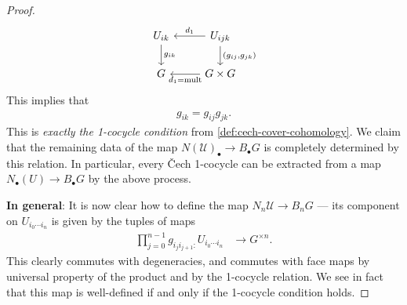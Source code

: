 \documentclass[11pt]{amsart}
\begin{document}
\begin{proof}
\[ \begin{tikzcd}
    U_{ik}\dar["g_{ik}"] & U_{ijk}\lar["d_1" above]\dar["{(g_{ij},g_{jk})}" right]\\
    G & G \times G\lar["d_1 = \text{mult}" below]
\end{tikzcd} \]
This implies that
\begin{align*}
    g_{ik} = g_{ij}g_{jk}.
\end{align*}
This is \textit{exactly the 1-cocycle condition} from \autoref{def:cech-cover-cohomology}. We claim that the remaining data of the map $N(\mathcal{U})_\bullet \to B_\bullet G$ is completely determined by this relation. In particular, every \v{C}ech 1-cocycle can be extracted from a map $N_\bullet(U) \to B_\bullet G$ by the above process.   

\textbf{In general}: It is now clear how to define the map $N_n \mathcal{U} \to B_n G$ --- its component on $U_{i_0 \cdots i_{n}}$ is given by the tuples of maps
\begin{align*}
    \prod_{j=0}^{n-1} g_{i_j i_{j+1} \colon }U_{i_0 \cdots i_{n}} &\to G^{\times n}.
\end{align*}
This clearly commutes with degeneracies, and commutes with face maps by universal property of the product and by the 1-cocycle relation. We see in fact that this map is well-defined if and only if the 1-cocycle condition holds.
\end{proof}
\end{document}
